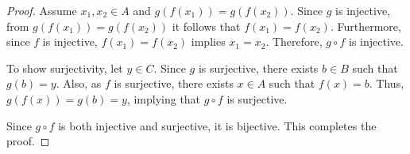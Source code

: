 \documentclass[10pt]{article}
\newenvironment{problem}[2][Problem]{\begin{trivlist}
\item[\hskip \labelsep {\bfseries #1}\hskip \labelsep {\bfseries #2.}]}{\end{trivlist}}
\begin{document}
\begin{problem}{2}
\begin{enumerate}
\begin{proof}
                Assume \( x_1, x_2 \in A \) and \( g(f(x_1)) = g(f(x_2)) \). Since \( g \) is injective, from \( g(f(x_1)) = g(f(x_2)) \) it follows that \( f(x_1) = f(x_2) \). Furthermore, since \( f \) is injective, \( f(x_1) = f(x_2) \) implies \( x_1 = x_2 \). Therefore, \( g \circ f \) is injective.

                To show surjectivity, let \( y \in C \). Since \( g \) is surjective, there exists \( b \in B \) such that \( g(b) = y \). Also, as \( f \) is surjective, there exists \( x \in A \) such that \( f(x) = b \). Thus, \( g(f(x)) = g(b) = y \), implying that \( g \circ f \) is surjective.

                Since \( g \circ f \) is both injective and surjective, it is bijective. This completes the proof.
            \end{proof}

	\end{enumerate}
\end{problem}
\end{document}
